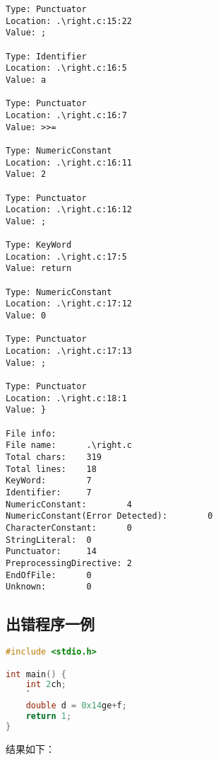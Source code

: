 \documentclass[blue,normal,cn]{elegantnote}
\begin{document}
\begin{lstlisting}
Type: Punctuator
Location: .\right.c:15:22
Value: ;

Type: Identifier
Location: .\right.c:16:5
Value: a

Type: Punctuator
Location: .\right.c:16:7
Value: >>=

Type: NumericConstant
Location: .\right.c:16:11
Value: 2

Type: Punctuator
Location: .\right.c:16:12
Value: ;

Type: KeyWord
Location: .\right.c:17:5
Value: return

Type: NumericConstant
Location: .\right.c:17:12
Value: 0

Type: Punctuator
Location: .\right.c:17:13
Value: ;

Type: Punctuator
Location: .\right.c:18:1
Value: }

File info:
File name:      .\right.c
Total chars:    319
Total lines:    18
KeyWord:        7
Identifier:     7
NumericConstant:        4
NumericConstant(Error Detected):        0
CharacterConstant:      0
StringLiteral:  0
Punctuator:     14
PreprocessingDirective: 2
EndOfFile:      0
Unknown:        0
\end{lstlisting}

\subsection{出错程序一例}

\begin{lstlisting}[language=C]
#include <stdio.h>

int main() {
    int 2ch;
    `
    double d = 0x14ge+f;
    return 1;
}
\end{lstlisting}

结果如下：
\end{document}

